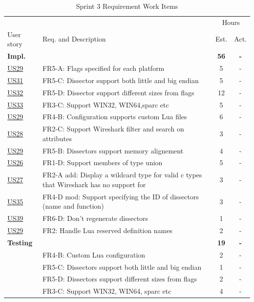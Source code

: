 \begin{table}[!htb] \small \center
\caption{Sprint 3 Requirement Work Items \label{tab:sprint3req}}
\begin{tabularx}{\textwidth}{l X c c}
	\toprule
	& & \multicolumn{2}{c}{Hours} \\
	\cmidrule(r){3-4}
	User story & Req. and Description & Est. & Act. \\
	\midrule
	\textbf{Impl.} &  & \textbf{56} & \textbf{-} \\
	\hyperref[tab:req:stories7]{US29} & FR5-A: Flags specified for each platform &  5  & - \\
	\hyperref[tab:req:stories8]{US31} & FR5-C: Dissector support both little and big endian & 5  & - \\
	\hyperref[tab:req:stories8]{US32} & FR5-D: Dissector support different sizes from flags & 12  & - \\
	\hyperref[tab:req:stories8]{US33} & FR3-C: Support WIN32, WIN64,sparc etc &  5  & - \\
	\hyperref[tab:req:stories7]{US29} & FR4-B: Configuration supports custom Lua files & 6 & -\\
	\hyperref[tab:req:stories7]{US28} & FR2-C: Support Wireshark filter and search on attributes &  3 & -\\
	\hyperref[tab:req:stories7]{US29} & FR5-B: Dissectors support memory alignement & 4 & -\\
	\hyperref[tab:req:stories7]{US26} & FR1-D: Support members of type union & 5  & -\\
	\hyperref[tab:req:stories7]{US27} & FR2-A add: Display a wildcard type for valid c types that Wireshark has no support for & 3  & - \\
	\hyperref[tab:req:stories9]{US35} & FR4-D mod: Support specifying the ID of dissectors (name and function) & 3  & - \\
	\hyperref[tab:req:stories9]{US39} & FR6-D: Don’t regenerate dissectors & 1 & - \\
	\hyperref[tab:req:stories7]{US29} & FR2: Handle Lua reserved definition names & 2 & - \\
	\addlinespace
	\textbf{Testing} &  & \textbf{19} & \textbf{-} \\
	 & FR4-B: Custom Lua configuration & 2 & - \\
	 & FR5-C: Dissectors support both little and big endian & 1 & - \\
	 & FR5-D: Dissectors support different sizes from flags & 2 & - \\
	 & FR3-C: Support WIN32, WIN64, sparc etc & 4 & - \\

\end{tabularx}
\end{table}
